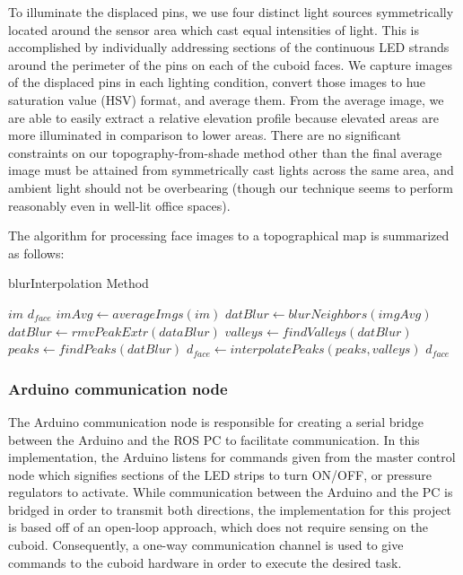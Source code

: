 \documentclass[letterpaper, 12 pt, conference]{ieeeconf}  %
\begin{document}
 \begin{equation}
     [\frac{\partial f(x,y)}{\partial x}, \frac{\partial f(x,y)}{\partial y}, -1]
 \end{equation}
 
 To illuminate the displaced pins, we use four distinct light sources symmetrically located around the sensor area which cast equal intensities of light. This is accomplished by individually addressing sections of the continuous LED strands around the perimeter of the pins on each of the cuboid faces. We capture images of the displaced pins in each lighting condition, convert those images to hue saturation value (HSV) format, and average them. From the average image, we are able to easily extract a relative elevation profile because elevated areas are more illuminated in comparison to lower areas. 
 There are no significant constraints on our topography-from-shade method other than the final average image must be attained from symmetrically cast lights across the same area, and ambient light should not be overbearing (though our technique seems to perform reasonably even in well-lit office spaces). 

The algorithm for processing face images to a topographical map is summarized as follows: 

\makeatletter
\def\BState{\State\hskip-\ALG@thistlm}
\makeatother
\begin{algorithm}
\caption{blurInterpolation Method}\label{euclid}
\begin{algorithmic}[1]
	\renewcommand{\algorithmicrequire}{\textbf{Input:}}
	\renewcommand{\algorithmicensure}{\textbf{Output:}}
	\Require $im$
	\Ensure $d_{face}$
    \State $imAvg \gets averageImgs(im)$
    \State $datBlur \gets blurNeighbors(imgAvg)$
    \State $datBlur \gets rmvPeakExtr(dataBlur)$
    \State $valleys \gets findValleys(datBlur)$
    \State $peaks \gets findPeaks(datBlur)$
    \State $d_{face} \gets interpolatePeaks(peaks,valleys)$
    \State \Return $d_{face}$
\end{algorithmic}
\end{algorithm}

\subsubsection{Arduino communication node} 

The Arduino communication node is responsible for creating a serial bridge between the Arduino and the ROS PC to facilitate communication. In this implementation, the Arduino listens for commands given from the master control node which signifies sections of the LED strips to turn ON/OFF, or pressure regulators to activate. While communication between the Arduino and the PC is bridged in order to transmit both directions, the implementation for this project is based off of an open-loop approach, which does not require sensing on the cuboid. Consequently, a one-way communication channel is used to give commands to the cuboid hardware in order to execute the desired task. 
\end{document}
